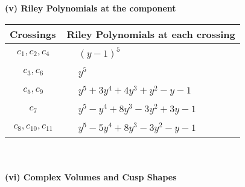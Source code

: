 \documentclass[1p]{elsarticle_modified}
\theoremstyle{definition}
\begin{document}
\newpage\renewcommand{\arraystretch}{1}
\flushleft \textbf{(v) Riley Polynomials at the component}\newline \\
\begin{tabular}{m{50pt}|m{274pt}}
Crossings & \hspace{64pt}Riley Polynomials at each crossing \\
\hline $$\begin{aligned}c_{1},c_{2},c_{4}\end{aligned}$$&$\begin{aligned}
&(y-1)^5
\end{aligned}$\\
\hline $$\begin{aligned}c_{3},c_{6}\end{aligned}$$&$\begin{aligned}
&y^5
\end{aligned}$\\
\hline $$\begin{aligned}c_{5},c_{9}\end{aligned}$$&$\begin{aligned}
&y^5+3 y^4+4 y^3+y^2- y-1
\end{aligned}$\\
\hline $$\begin{aligned}c_{7}\end{aligned}$$&$\begin{aligned}
&y^5- y^4+8 y^3-3 y^2+3 y-1
\end{aligned}$\\
\hline $$\begin{aligned}c_{8},c_{10},c_{11}\end{aligned}$$&$\begin{aligned}
&y^5-5 y^4+8 y^3-3 y^2- y-1
\end{aligned}$\\
\hline
\end{tabular}\\~\\
\newpage\flushleft \textbf{(vi) Complex Volumes and Cusp Shapes}
\end{document}
